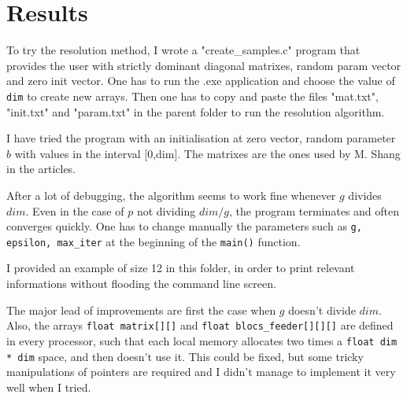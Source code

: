 \documentclass[a4paper,12pt]{article}
\begin{document}
\section{Results}
To try the resolution method, I wrote a "create\_samples.c" program that provides the user with strictly dominant diagonal matrixes, random param vector and zero init vector. One has to run the .exe application and choose the value of {\tt dim} to create new arrays. Then one has to copy and paste the files "mat.txt", "init.txt" and "param.txt" in the parent folder to run the resolution algorithm.

I have tried the program with an initialisation at zero vector, random parameter $b$ with values in the interval [0,dim]. The matrixes are the ones used by M. Shang in the articles. 

After a lot of debugging, the algorithm seems to work fine whenever $g$ divides $dim$. Even in the case of $p$ not dividing $dim/g$, the program terminates and often converges quickly. One has to change manually the  parameters such as {\tt g, epsilon, max\_iter} at the beginning of the {\tt main()} function.

I provided an example of size 12 in this folder, in order to print relevant informations without flooding the command line screen. 

The major lead of improvements are first the case when $g$ doesn't divide $dim$. Also, the arrays {\tt float matrix[][]} and {\tt float blocs\_feeder[][][]} are defined in every processor, such that each local memory allocates two times a {\tt float dim * dim} space, and then doesn't use it. This could be fixed, but some tricky manipulations of pointers are required and I didn't manage to implement it very well when I tried.
\vspace{0,3cm}
\end{document}
